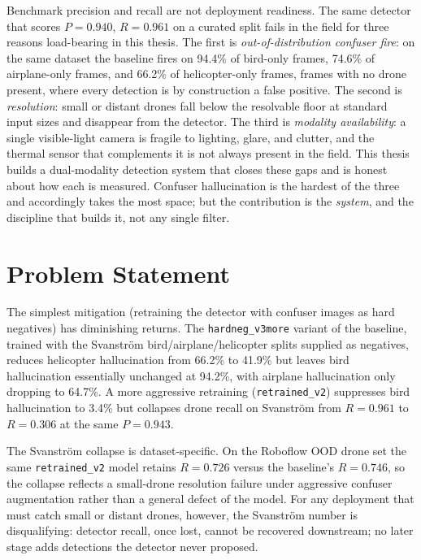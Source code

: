 Benchmark precision and recall are not deployment readiness. The same detector that scores $P=0.940$, $R=0.961$ on a curated split fails in the field for three reasons load-bearing in this thesis. The first is \emph{out-of-distribution confuser fire}: on the same dataset the baseline fires on 94.4\% of bird-only frames, 74.6\% of airplane-only frames, and 66.2\% of helicopter-only frames, frames with no drone present, where every detection is by construction a false positive. The second is \emph{resolution}: small or distant drones fall below the resolvable floor at standard input sizes and disappear from the detector. The third is \emph{modality availability}: a single visible-light camera is fragile to lighting, glare, and clutter, and the thermal sensor that complements it is not always present in the field. This thesis builds a dual-modality detection system that closes these gaps and is honest about how each is measured. Confuser hallucination is the hardest of the three and accordingly takes the most space; but the contribution is the \emph{system}, and the discipline that builds it, not any single filter.

\section{Problem Statement}

The simplest mitigation (retraining the detector with confuser images as hard negatives) has diminishing returns. The \texttt{hardneg\_v3more} variant of the baseline, trained with the Svanstr\"om bird/airplane/helicopter splits supplied as negatives, reduces helicopter hallucination from 66.2\% to 41.9\% but leaves bird hallucination essentially unchanged at 94.2\%, with airplane hallucination only dropping to 64.7\%. A more aggressive retraining (\texttt{retrained\_v2}) suppresses bird hallucination to 3.4\% but collapses drone recall on Svanstr\"om from $R=0.961$ to $R=0.306$ at the same $P=0.943$.

The Svanstr\"om collapse is dataset-specific. On the Roboflow OOD drone set the same \texttt{retrained\_v2} model retains $R=0.726$ versus the baseline's $R=0.746$, so the collapse reflects a small-drone resolution failure under aggressive confuser augmentation rather than a general defect of the model. For any deployment that must catch small or distant drones, however, the Svanstr\"om number is disqualifying: detector recall, once lost, cannot be recovered downstream; no later stage adds detections the detector never proposed.

